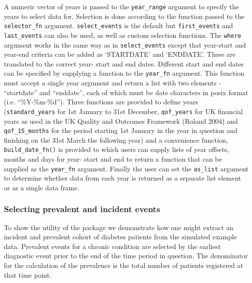 \documentclass[]{article}
\begin{document}
A numeric vector of years is passed to the \texttt{year\_range} argument
to specify the years to select data for. Selection is done according to
the function passed to the \texttt{selector\_fn} argument.
\texttt{select\_events} is the default but \texttt{first\_events} and
\texttt{last\_events} can also be used, as well as custom selection
functions. The \texttt{where} argument works in the same way as in
\texttt{select\_events} except that year-start and year-end criteria can
be added as `STARTDATE' and `ENDDATE'. These are translated to the
correct year- start and end dates. Different start and end dates can be
specified by supplying a function to the \texttt{year\_fn} argument.
This function must accept a single year argument and return a list with
two elements - ``startdate'' and ``enddate'', each of which must be date
characters in posix format (i.e. ``\%Y-\%m-\%d''). Three functions are
provided to define years (\texttt{standard\_years} for 1st January to
31st December, \texttt{qof\_years} for UK financial years as used in the
UK Quality and Outcomes Framework (Roland 2004) and
\texttt{qof\_15\_months} for the period starting 1st January in the year
in question and finishing on the 31st March the following year) and a
convenience function, \texttt{build\_date\_fn()} is provided to which
users can supply lists of year offsets, months and days for year- start
and end to return a function that can be supplied as the
\texttt{year\_fn} argument. Finally the user can set the
\texttt{as\_list} argument to determine whether data from each year is
returned as a separate list element or as a single data frame.

\subsubsection{Selecting prevalent and incident
events}\label{selecting-prevalent-and-incident-events}

To show the utility of the package we demonstrate how one might extract
an incident and prevalent cohort of diabetes patients from the simulated
example data. Prevalent events for a chronic condition are selected by
the earliest diagnostic event prior to the end of the time period in
question. The denominator for the calculation of the prevalence is the
total number of patients registered at that time point.
\end{document}
